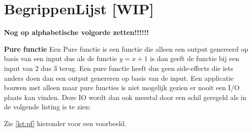 
\chapter{BegrippenLijst [WIP]}



\textbf{Nog op alphabetische volgorde zetten!!!!!!}

\textbf{Pure functie}
Een Pure functie is een functie die alleen een output genereerd op basis van een input dus als de functie \( y = x+1\) is dan geeft de functie bij een input van 2 dus 3 terug. Een pure functie heeft dus geen side-effects die iets anders doen dan een output genereren op basis van de input. Een applicatie bouwen met alleen maar pure functies is niet mogelijk gezien er nooit een I/O plaats kan vinden. Deze IO wordt dan ook meestal door een schil geregeld als in de volgende listing is te zien:

Zie \autoref{lst:pf} hieronder voor een voorbeeld.

